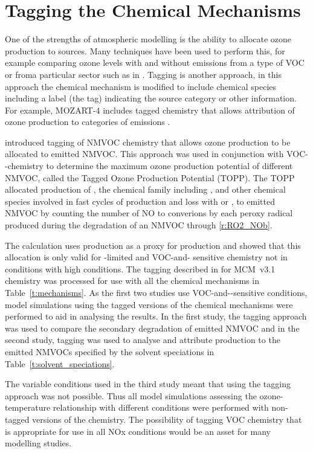 \section{Tagging the Chemical Mechanisms} \label{s:tagging}
One of the strengths of atmospheric modelling is the ability to allocate ozone production to sources.
Many techniques have been used to perform this, for example comparing ozone levels with and without emissions from a type of VOC or froma particular sector such as in \citet{Butler:2012}. 
Tagging is another approach, in this approach the chemical mechanism is modified to include chemical species including a label (the tag) indicating the source category or other information.
For example, MOZART-4 includes tagged chemistry that allows attribution of ozone production to categories of  emissions \citep{Emmons:2012}. 

\citet{Butler:2011} introduced tagging of NMVOC chemistry that allows ozone production to be allocated to emitted NMVOC.
This approach was used in conjunction with VOC--chemistry to determine the maximum ozone production potential of different NMVOC, called the Tagged Ozone Production Potential (TOPP).
The TOPP allocated production of , the chemical family including ,  and other chemical species involved in fast cycles of production and loss with  or , to emitted NMVOC by counting the number of NO to  converions by each peroxy radical produced during the degradation of an NMVOC through \eqref{r:RO2_NOb}.

The calculation uses  production as a proxy for  production and \citet{Butler:2011} showed that this allocation is only valid for -limited and VOC-and- sensitive chemistry not in conditions with high  conditions.
The tagging described in \citet{Butler:2011} for MCM~v3.1 chemistry was processed for use with all the chemical mechanisms in Table~\ref{t:mechanisms}.
As the first two studies use VOC-and--sensitive conditions, model simulations using the tagged versions of the chemical mechanisms were performed to aid in analysing the results.
In the first study, the tagging approach was used to compare the secondary degradation of emitted NMVOC and in the second study, tagging was used to analyse and attribute  production to the emitted NMVOCs specified by the solvent speciations in Table~\ref{t:solvent_speciations}.

The variable  conditions used in the third study meant that using the tagging approach was not possible.
Thus all model simulations assessing the ozone-temperature relationship with different  conditions were performed with non-tagged versions of the chemistry.
The possibility of tagging VOC chemistry that is appropriate for use in all NOx conditions would be an asset for many modelling studies.
